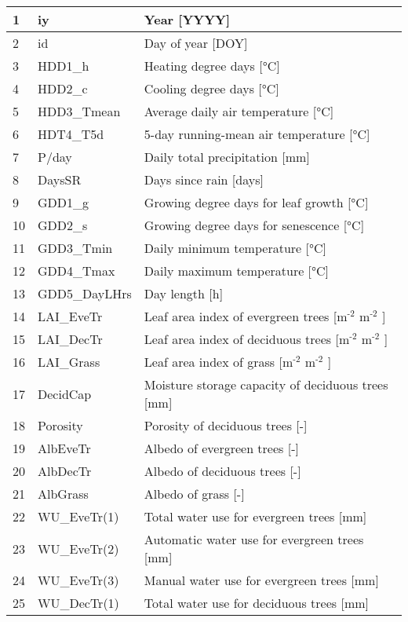 \documentclass[letterpaper,10pt,english]{sphinxmanual}
\begin{document}
\begin{savenotes}
\begin{longtable}{|l|l|l|}
1
&
iy
&
Year {[}YYYY{]}
\\
\hline
2
&
id
&
Day of year {[}DOY{]}
\\
\hline
3
&
HDD1\_h
&
Heating degree days {[}°C{]}
\\
\hline
4
&
HDD2\_c
&
Cooling degree days {[}°C{]}
\\
\hline
5
&
HDD3\_Tmean
&
Average daily air temperature {[}°C{]}
\\
\hline
6
&
HDT4\_T5d
&
5-day running-mean air temperature {[}°C{]}
\\
\hline
7
&
P/day
&
Daily total precipitation {[}mm{]}
\\
\hline
8
&
DaysSR
&
Days since rain {[}days{]}
\\
\hline
9
&
GDD1\_g
&
Growing degree days for leaf growth {[}°C{]}
\\
\hline
10
&
GDD2\_s
&
Growing degree days for senescence {[}°C{]}
\\
\hline
11
&
GDD3\_Tmin
&
Daily minimum temperature {[}°C{]}
\\
\hline
12
&
GDD4\_Tmax
&
Daily maximum temperature {[}°C{]}
\\
\hline
13
&
GDD5\_DayLHrs
&
Day length {[}h{]}
\\
\hline
14
&
LAI\_EveTr
&
Leaf area index of evergreen trees {[}m$^{\text{-2}}$ m$^{\text{-2}}$ {]}
\\
\hline
15
&
LAI\_DecTr
&
Leaf area index of deciduous trees {[}m$^{\text{-2}}$ m$^{\text{-2}}$ {]}
\\
\hline
16
&
LAI\_Grass
&
Leaf area index of grass {[}m$^{\text{-2}}$ m$^{\text{-2}}$ {]}
\\
\hline
17
&
DecidCap
&
Moisture storage capacity of deciduous trees {[}mm{]}
\\
\hline
18
&
Porosity
&
Porosity of deciduous trees {[}-{]}
\\
\hline
19
&
AlbEveTr
&
Albedo of evergreen trees {[}-{]}
\\
\hline
20
&
AlbDecTr
&
Albedo of deciduous trees {[}-{]}
\\
\hline
21
&
AlbGrass
&
Albedo of grass {[}-{]}
\\
\hline
22
&
WU\_EveTr(1)
&
Total water use for evergreen trees {[}mm{]}
\\
\hline
23
&
WU\_EveTr(2)
&
Automatic water use for evergreen trees {[}mm{]}
\\
\hline
24
&
WU\_EveTr(3)
&
Manual water use for evergreen trees {[}mm{]}
\\
\hline
25
&
WU\_DecTr(1)
&
Total water use for deciduous trees {[}mm{]}

\end{longtable}
\end{savenotes}
\end{document}
